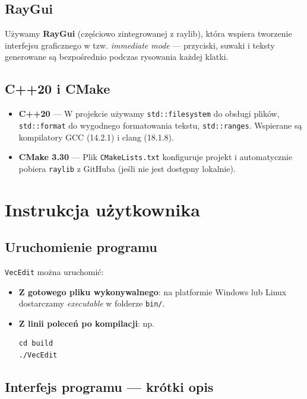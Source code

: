 \documentclass[a4paper,12pt]{article}
\begin{document}
\subsection{RayGui}
Używamy \textbf{RayGui} (częściowo zintegrowanej z raylib), która wspiera tworzenie
interfejsu graficznego w tzw. \emph{immediate mode} — przyciski, suwaki i 
teksty generowane są bezpośrednio podczas rysowania każdej klatki.

\subsection{C++20 i CMake}
\begin{itemize}
    \item \textbf{C++20} — W projekcie używamy \texttt{std::filesystem} do obsługi plików,
      \texttt{std::format} do wygodnego formatowania tekstu, \texttt{std::ranges}. 
      Wspierane są kompilatory GCC (14.2.1) i clang (18.1.8).

    \item \textbf{CMake 3.30} — Plik \texttt{CMakeLists.txt} konfiguruje projekt
      i automatycznie pobiera \texttt{raylib} z GitHuba (jeśli nie jest dostępny lokalnie).
\end{itemize}

\section{Instrukcja użytkownika}

\subsection{Uruchomienie programu}
\texttt{VecEdit} można uruchomić:
\begin{itemize}
    \item \textbf{Z gotowego pliku wykonywalnego}: na platformie Windows lub Linux
    dostarczamy \emph{executable} w folderze \texttt{bin/}.
    \item \textbf{Z linii poleceń po kompilacji}: np.
\begin{verbatim}
cd build
./VecEdit
\end{verbatim}
\end{itemize}

\subsection{Interfejs programu — krótki opis}
\end{document}
